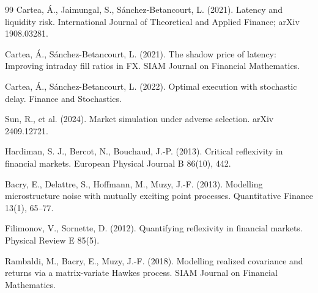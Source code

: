 \documentclass[11pt]{article}
\begin{document}
\begin{thebibliography}{99}
Cartea, \'A., Jaimungal, S., S\'anchez-Betancourt, L. (2021).
Latency and liquidity risk.
International Journal of Theoretical and Applied Finance; arXiv 1908.03281.

Cartea, \'A., S\'anchez-Betancourt, L. (2021).
The shadow price of latency: Improving intraday fill ratios in FX.
SIAM Journal on Financial Mathematics.

Cartea, \'A., S\'anchez-Betancourt, L. (2022).
Optimal execution with stochastic delay.
Finance and Stochastics.

Sun, R., et al. (2024).
Market simulation under adverse selection.
arXiv 2409.12721.

Hardiman, S. J., Bercot, N., Bouchaud, J.-P. (2013).
Critical reflexivity in financial markets.
European Physical Journal B 86(10), 442.

Bacry, E., Delattre, S., Hoffmann, M., Muzy, J.-F. (2013).
Modelling microstructure noise with mutually exciting point processes.
Quantitative Finance 13(1), 65--77.

Filimonov, V., Sornette, D. (2012).
Quantifying reflexivity in financial markets.
Physical Review E 85(5).

Rambaldi, M., Bacry, E., Muzy, J.-F. (2018).
Modelling realized covariance and returns via a matrix-variate Hawkes process.
SIAM Journal on Financial Mathematics.

\end{thebibliography}
\end{document}
